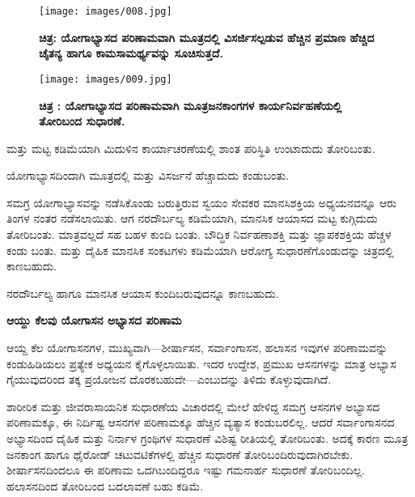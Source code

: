 \begin{figure}
\texttt{[image: images/008.jpg]}
\caption{\textbf{ಚಿತ್ರ:  ಯೋಗಾಭ್ಯಾಸದ ಪರಿಣಾಮವಾಗಿ ಮೂತ್ರದಲ್ಲಿ ವಿಸರ್ಜಿಸಲ್ಪಡುವ ಹೆಚ್ಚಿನ  ಪ್ರಮಾಣ ಹೆಚ್ಚಿದ ಚೈತನ್ಯ ಹಾಗೂ ಕಾಮಸಾಮರ್ಥ್ಯವನ್ನು ಸೂಚಿಸುತ್ತದೆ.} }
\end{figure}

\begin{center}
\end{center}


\begin{figure}
\texttt{[image: images/009.jpg]}
\caption{\textbf{ಚಿತ್ರ : ಯೋಗಾಭ್ಯಾಸದ ಪರಿಣಾಮವಾಗಿ ಮೂತ್ರಜನಕಾಂಗಗಳ ಕಾರ್ಯನಿರ್ವಹಣೆಯಲ್ಲಿ ತೋರಿಬಂದ ಸುಧಾರಣೆ.} }
\end{figure}

 ಮತ್ತು  ಮಟ್ಟ ಕಡಿಮೆಯಾಗಿ ಮಿದುಳಿನ ಕಾರ್ಯಾಚರಣೆಯಲ್ಲಿ ಶಾಂತ ಪರಿಸ್ಥಿತಿ ಉಂಟಾದುದು ತೋರಿಬಂತು.

ಯೋಗಾಭ್ಯಾಸದಿಂದಾಗಿ ಮೂತ್ರದಲ್ಲಿ  ಮತ್ತು  ವಿಸರ್ಜನೆ ಹೆಚ್ಚಾದುದು ಕಂಡುಬಂತು.

ಸಮಗ್ರ ಯೋಗಾಭ್ಯಾಸವನ್ನು ನಡೆಸಿಕೊಂಡು ಬರುತ್ತಿರುವ ಸ್ವಯಂ ಸೇವಕರ ಮಾನಸಿಶಕ್ತಿಯ ಅಧ್ಯಯನವನ್ನೂ ಆರು ತಿಂಗಳ ನಂತರ ನಡೆಸಲಾಯಿತು. ಆಗ ನರದೌರ್ಬಲ್ಯ  ಕಡಿಮೆಯಾಗಿ, ಮಾನಸಿಕ ಆಯಾಸದ ಮಟ್ಟ ಕುಗ್ಗಿದುದು ತೋರಿಬಂತು. ಮಾತ್ರವಲ್ಲದೆ  ಸಹ ಬಹಳ ಕುಂದಿ ಬಂತು. ಬೌದ್ಧಿಕ ನಿರ್ವಹಣಾಶಕ್ತಿ ಮತ್ತು ಜ್ಞಾಪಕಶಕ್ತಿಯ ಹೆಚ್ಚಳ ಕಂಡು ಬಂತು.  ಮತ್ತು  ದೈಹಿಕ ಮಾನಸಿಕ ಸಂಕಟಗಳು ಕಡಿಮೆಯಾಗಿ ಆರೋಗ್ಯ ಸುಧಾರಣೆಗೊಂಡುದನ್ನು ಚಿತ್ರದಲ್ಲಿ ಕಾಣಬಹುದು.

ನರದೌರ್ಬಲ್ಯ ಹಾಗೂ ಮಾನಸಿಕ ಆಯಾಸ ಕುಂದಿಬರುವುದನ್ನೂ ಕಾಣಬಹುದು.

\textbf{ಆಯ್ದು ಕೆಲವು ಯೋಗಾಸನ ಅಭ್ಯಾಸದ ಪರಿಣಾಮ}

ಆಯ್ದ ಕೆಲ ಯೋಗಾಸನಗಳ, ಮುಖ್ಯವಾಗಿ—ಶೀರ್ಷಾಸನ, ಸರ್ವಾಂಗಾಸನ, ಹಲಾಸನ ಇವುಗಳ ಪರಿಣಾಮವನ್ನು ಕಂಡುಹಿಡಿಯಲು ಪ್ರತ್ಯೇಕ ಅಧ್ಯಯನ ಕೈಗೊಳ್ಳಲಾಯಿತು. ಇದರ ಉದ್ದೇಶ, ಪ್ರಮುಖ ಆಸನಗಳನ್ನು ಮಾತ್ರ ಅಭ್ಯಾಸ ಗೈಯುವುದರಿಂದ ತಕ್ಕ ಪ್ರಯೋಜನ ದೊರಕಬಹುದೇ—ಎಂಬುದನ್ನು ತಿಳಿದು ಕೊಳ್ಳುವುದಾಗಿದೆ.

ಶಾರೀರಿಕ ಮತ್ತು ಜೀವರಾಸಾಯನಿಕ ಸುಧಾರಣೆಯ ವಿಚಾರದಲ್ಲಿ ಮೇಲೆ ಹೇಳಿದ್ದ ಸಮಗ್ರ ಆಸನಗಳ ಅಭ್ಯಾಸದ ಪರಿಣಾಮಕ್ಕೂ, ಈ ನಿರ್ದಿಷ್ಟ ಆಸನಗಳ ಪರಿಣಾಮಕ್ಕೂ ಹೆಚ್ಚಿನ ವ್ಯತ್ಯಾಸ ಕಂಡುಬರಲಿಲ್ಲ. ಆದರೆ ಸರ್ವಾಂಗಾಸನದ ಅಭ್ಯಾಸದಿಂದ ದೈಹಿಕ ಮತ್ತು ನಿರ್ನಾಳ ಗ್ರಂಥಿಗಳ  ಸುಧಾರಣೆ ವಿಶಿಷ್ಟ ರೀತಿಯಲ್ಲಿ ತೋರಿಬಂತು. ಅದಕ್ಕೆ ಕಾರಣ ಮೂತ್ರ ಜನಕಾಂಗ ಹಾಗೂ ಥೈರೋಡ್ ಚಟುವಟಿಕೆಗಳಲ್ಲಿ ಹೆಚ್ಚಿನ ಸುಧಾರಣೆ ತೋರಿಬಂದಿರುವುದಾಗಿರಬೇಕು. ಶೀರ್ಷಾಸನದಿಂದಲೂ ಈ ಪರಿಣಾಮ ಒದಗಿಬಂದಿದ್ದರೂ ಇಷ್ಟು ಗಮನಾರ್ಹ ಸುಧಾರಣೆ ತೋರಿಬಂದಿಲ್ಲ. ಹಲಾಸನದಿಂದ ತೋರಿಬಂದ ಬದಲಾವಣೆ ಬಹು ಕಡಿಮೆ.

